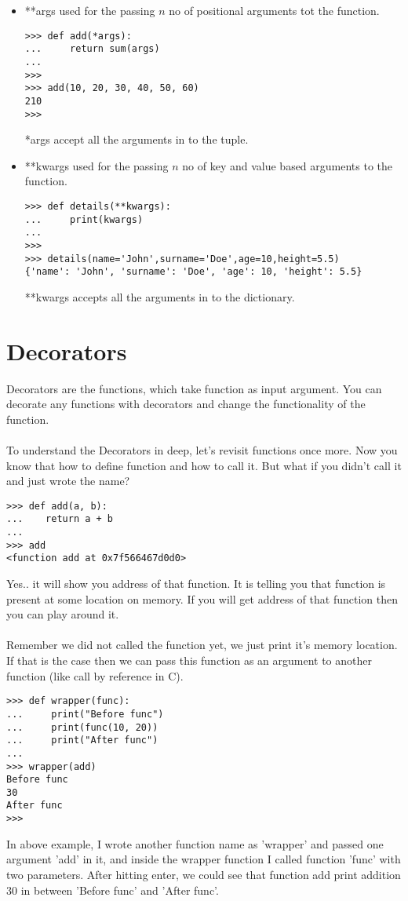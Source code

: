 \documentclass[letterpaper,12pt]{book}
\begin{document}
\begin{itemize}
	\item **args used for the passing $n$ no of positional arguments tot the function.
	      \begin{lstlisting}
>>> def add(*args):
...     return sum(args)
... 
>>> 
>>> add(10, 20, 30, 40, 50, 60)
210
>>> 
\end{lstlisting}
	      *args accept all the arguments in to the tuple.
	\item **kwargs used for the passing $n$ no of key and value based arguments to the function.
	      \begin{lstlisting}
>>> def details(**kwargs):
...     print(kwargs)
... 
>>> 
>>> details(name='John',surname='Doe',age=10,height=5.5)
{'name': 'John', 'surname': 'Doe', 'age': 10, 'height': 5.5}
\end{lstlisting}
	      **kwargs accepts all the arguments in to the dictionary.
\end{itemize}

\section{Decorators}
Decorators are the functions, which take function as input argument. You can decorate any functions with decorators and change the functionality of the function.
\paragraph{}
To understand the Decorators in deep, let's revisit functions once more. Now you know that how to define function and how to call it. But what if you didn't call it and just wrote the name?
\begin{lstlisting}
>>> def add(a, b):
...    return a + b
...
>>> add
<function add at 0x7f566467d0d0>
\end{lstlisting}

Yes.. it will show you address of that function. It is telling you that function is present at some location on memory. If you will get address of that function then you can play around it.
\paragraph{}
Remember we did not called the function yet, we just print it's memory location. If that is the case then we can pass this function as an argument to another function (like call by reference in C).

\begin{lstlisting}
>>> def wrapper(func):
...     print("Before func")
...     print(func(10, 20))
...     print("After func")
... 
>>> wrapper(add)
Before func
30
After func
>>> 
\end{lstlisting}
In above example, I wrote another function name as 'wrapper' and passed one argument 'add' in it, and inside the wrapper function I called function 'func' with two parameters.
After hitting enter, we could see that function add print addition 30 in between 'Before func' and 'After func'.
\end{document}
